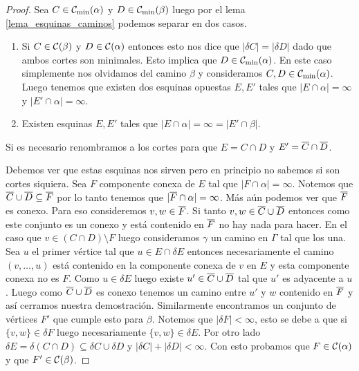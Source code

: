 \documentclass[tesis.tex]{subfiles}
\begin{document}
\begin{proof}
	Sea $C \in {\cal C}_{\text{min}}(\alpha)$ y $D \in {\cal C}_{\text{min}}(\beta)$ luego por el lema \ref{lema_esquinas_caminos} podemos separar en dos casos.
	\begin{enumerate}
		\item Si $C \in {\cal C}(\beta)$ y $D \in {\cal C}(\alpha)$ entonces esto nos dice que $|\delta C| = |\delta D|$ dado que ambos cortes son minimales.
		Esto implica que $D \in {\cal C}_{\text{min}}(\alpha)$. 
		En este caso simplemente nos olvidamos del camino $\beta$ y consideramos $C,D \in {\cal C}_{\text{min}}(\alpha)$.
		Luego tenemos que existen dos esquinas opuestas $E,E'$ tales que $|E \cap \alpha| = \infty$ y $|E' \cap \alpha| = \infty$.
		\item Existen esquinas $E,E'$ tales que $|E \cap \alpha| = \infty = |E' \cap \beta|$.
	\end{enumerate}	
	
	Si es necesario renombramos a los cortes para que $E = C \cap D$ y $E' = \overline C \cap \overline D$.
	
	
	Debemos ver que estas esquinas nos sirven pero en principio no sabemos si son cortes siquiera.
	Sea $F$ componente conexa de $E$ tal que $|F \cap \alpha| = \infty$.
	Notemos que $\overline C \cup \overline D \subseteq \overline F$ por lo tanto tenemos que $|\overline F \cap \alpha|=\infty$.
	Más aún podemos ver que $\overline F$ es conexo.
	Para eso consideremos $v,w \in \overline F$.
	Si tanto $v,w \in \overline C \cup \overline D$ entonces como este conjunto es un conexo y está contenido en $\overline F$ no hay nada para hacer.
	En el caso que $v \in (C \cap D) \setminus F$ luego consideramos $\gamma$ un camino en $\Gamma$ tal que los una.
	Sea $u$ el primer vértice tal que $u \in E \cap \delta E$ entonces necesariamente el camino $(v, \dots, u)$ está contenido en la componente conexa de $v$ en $E$ y esta componente conexa no es $F$. 
	Como $u \in \delta E$ luego existe $u' \in \overline C \cup \overline D$ tal que $u'$ es adyacente a $u$. 
	Luego como $\overline C \cup \overline D$ es conexo tenemos un camino entre $u'$ y $w$ contenido en $\overline F$ y así cerramos nuestra demostración.
	Similarmente encontramos un conjunto de vértices $F'$ que cumple esto para $\beta$.
	Notemos que $|\delta F| < \infty$, esto se debe a que si $\{ v,w \} \in \delta F$ luego necesariamente $\{v,w\} \in \delta E$.
	Por otro lado $\delta E = \delta (C \cap D)  \subseteq \delta C \cup \delta D$ y $|\delta C| + |\delta D| < \infty$. 
	Con esto probamos que $F \in {\cal C}(\alpha)$ y que $F' \in {\cal C}(\beta)$.
	
	

\end{proof}
\end{document}
